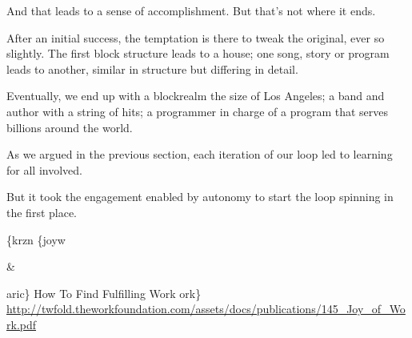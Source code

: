 And that leads to a sense of accomplishment. But that's not where it
ends.

After an initial success, the temptation is there to tweak the original,
ever so slightly. The first block structure leads to a house; one song,
story or program leads to another, similar in structure but differing in
detail.

Eventually, we end up with a blockrealm the size of Los Angeles; a band
and author with a string of hits; a programmer in charge of a program
that serves billions around the world.

As we argued in the previous section, each iteration of our loop led to
learning for all involved.

But it took the engagement enabled by autonomy to start the loop
spinning in the first place.

{%
}
{%
\FL
\parbox[t]{0.07\columnwidth}{\raggedright
\{krzn \{joyw
} & \parbox[t]{0.26\columnwidth}{\raggedright
aric\} How To Find Fulfilling Work ork\}
\href{http://twfold.theworkfoundation.com/assets/docs/publications/145\_Joy\_of\_Work.pdf}{http://twfold.theworkfoundation.com/assets/docs/publications/145\_Joy\_of\_Work.pdf}
}
\LL
}
